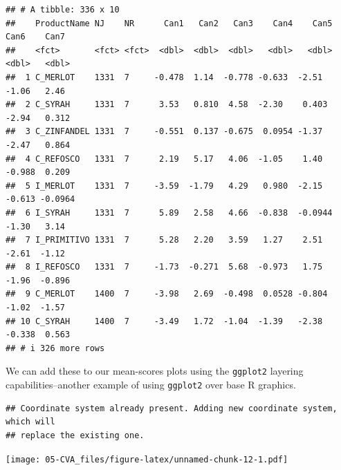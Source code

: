\documentclass[
]{book}
\newenvironment{Shaded}{\begin{snugshade}}{\end{snugshade}}
\newcommand{\AttributeTok}[1]{\textcolor[rgb]{0.13,0.29,0.53}{#1}}
\newcommand{\FunctionTok}[1]{\textcolor[rgb]{0.13,0.29,0.53}{\textbf{#1}}}
\newcommand{\NormalTok}[1]{#1}
\newcommand{\SpecialCharTok}[1]{\textcolor[rgb]{0.81,0.36,0.00}{\textbf{#1}}}
\newcommand{\StringTok}[1]{\textcolor[rgb]{0.31,0.60,0.02}{#1}}
\begin{document}
\begin{verbatim}
## # A tibble: 336 x 10
##    ProductName NJ    NR      Can1   Can2   Can3    Can4    Can5   Can6    Can7
##    <fct>       <fct> <fct>  <dbl>  <dbl>  <dbl>   <dbl>   <dbl>  <dbl>   <dbl>
##  1 C_MERLOT    1331  7     -0.478  1.14  -0.778 -0.633  -2.51   -1.06   2.46  
##  2 C_SYRAH     1331  7      3.53   0.810  4.58  -2.30    0.403  -2.94   0.312 
##  3 C_ZINFANDEL 1331  7     -0.551  0.137 -0.675  0.0954 -1.37   -2.47   0.864 
##  4 C_REFOSCO   1331  7      2.19   5.17   4.06  -1.05    1.40   -0.988  0.209 
##  5 I_MERLOT    1331  7     -3.59  -1.79   4.29   0.980  -2.15   -0.613 -0.0964
##  6 I_SYRAH     1331  7      5.89   2.58   4.66  -0.838  -0.0944 -1.30   3.14  
##  7 I_PRIMITIVO 1331  7      5.28   2.20   3.59   1.27    2.51   -2.61  -1.12  
##  8 I_REFOSCO   1331  7     -1.73  -0.271  5.68  -0.973   1.75   -1.96  -0.896 
##  9 C_MERLOT    1400  7     -3.98   2.69  -0.498  0.0528 -0.804  -1.02  -1.57  
## 10 C_SYRAH     1400  7     -3.49   1.72  -1.04  -1.39   -2.38   -0.338  0.563 
## # i 326 more rows
\end{verbatim}

We can add these to our mean-scores plots using the \texttt{ggplot2} layering capabilities--another example of using \texttt{ggplot2} over base R graphics.

\begin{Shaded}
\end{Shaded}

\begin{verbatim}
## Coordinate system already present. Adding new coordinate system, which will
## replace the existing one.
\end{verbatim}

\texttt{[image: 05-CVA\_files/figure-latex/unnamed-chunk-12-1.pdf]}
\end{document}

